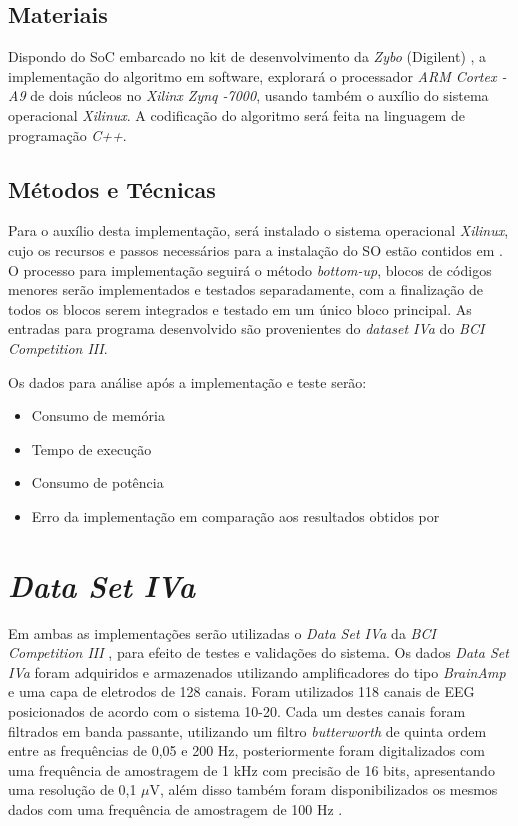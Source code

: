 \subsection{Materiais}

Dispondo do SoC embarcado no kit de desenvolvimento da \textit{Zybo} (Digilent) , a implementação do algoritmo em 
software, explorará o processador \textit{ARM  Cortex -A9} de dois núcleos no \textit{Xilinx Zynq -7000}, usando também
o auxílio do sistema operacional \textit{Xilinux}. A codificação do algoritmo será feita na linguagem de programação \textit{C++}.

\subsection{Métodos e Técnicas}
 
Para o auxílio desta implementação, será instalado o sistema operacional \textit{Xilinux}, cujo os recursos e passos necessários
para a instalação do SO estão contidos em \cite{zynqBook}.
O processo para implementação seguirá o método \textit{bottom-up}, blocos de códigos menores serão implementados e testados
separadamente, com a finalização de todos os blocos serem integrados e testado em um único bloco principal. As entradas
para programa desenvolvido são provenientes do \textit{dataset IVa} do \textit{BCI Competition III}.

 
Os dados para análise após a implementação e teste serão:
\begin{itemize}[noitemsep]
\item Consumo de memória
\item Tempo de execução
\item Consumo de potência
\item Erro da implementação em comparação aos resultados obtidos por \cite{F.Lotte}
\end{itemize}

\section{\textit{Data Set IVa}}

Em ambas as implementações serão utilizadas o \textit{Data Set IVa} da \textit{BCI Competition III} \cite{BCICompetition}, para efeito de testes e validações do sistema.
Os dados \textit{Data Set IVa} foram adquiridos e armazenados utilizando amplificadores do tipo \textit{BrainAmp} e uma capa de eletrodos de 128 canais. Foram utilizados 118 canais de EEG posicionados de acordo com o sistema 10-20. Cada um destes canais foram filtrados em banda passante, utilizando um filtro \textit{butterworth} de quinta ordem entre as frequências de 0,05 e 200 Hz, posteriormente foram digitalizados com uma frequência de amostragem de 1 kHz com precisão de 16 bits, apresentando uma resolução de 0,1 $\mu$V, além disso também foram disponibilizados os mesmos dados com uma frequência de amostragem de 100 Hz \cite{siteBCI}.
\vspace{\onelineskip}

